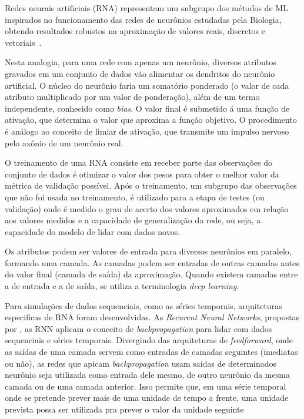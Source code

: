 Redes neurais artificiais (RNA) representam um subgrupo dos métodos de ML inspirados no funcionamento das redes de neurônios estudadas pela Biologia, obtendo resultados robustos na aproximação de valores reais, discretos e  vetoriais~\cite{mitchell1997}.

Nesta analogia, para uma rede com apenas um neurônio, diversos atributos gravados em um conjunto de dados vão alimentar os dendritos do neurônio artificial. O núcleo do neurônio faria um somatório ponderado (o valor de cada atributo multiplicado por um valor de ponderação), além de um termo independente, conhecido como \emph{bias}. O valor final é submetido á uma função de ativação, que determina o valor que aproxima a função objetivo. O procedimento é análogo ao conceito de limiar de ativação, que transmite um impulso nervoso pelo axônio de um neurônio real. 

O treinamento de uma RNA consiste em receber parte das observações do conjunto de dados é otimizar o valor dos pesos para obter o melhor valor da métrica de validação possível. Após o treinamento, um subgrupo das observações que não foi usada no treinamento, é utilizado para  a etapa de testes (ou validação) onde é medido o grau de acerto dos valores aproximados em relação aos valores medidos e a capacidade de generalização da rede, ou seja, a capacidade do modelo de lidar com dados novos.

Os atributos podem ser valores de entrada para diversos neurônios em paralelo, formando uma camada. As camadas podem ser entradas de outras camadas antes do valor final (camada de saída) da aproximação. Quando existem camadas entre a de entrada e a de saída, se utiliza a terminologia \emph{deep learning}. 

Para simulações de dados sequenciais, como as séries temporais, arquiteturas especificas de RNA foram desenvolvidas. As \emph{Recurent Neural Networks}, propostas por , as RNN aplicam o conceito de \emph{backpropagation} para lidar com dados sequenciais e séries temporais. Divergindo das arquiteturas de \emph{feedforward}, onde as saídas de uma camada servem como entradas de camadas seguintes (imediatas ou não), as redes que apicam \emph{backpropagation} usam saídas de determinados neurônio seja utilizada como entrada dele mesmo, de outro neurônio da mesma camada ou de uma camada anterior. Isso permite que, em uma série temporal onde se pretende prever mais de uma unidade de tempo a frente, uma unidade prevista possa ser utilizada pra prever o valor da unidade seguinte
 
